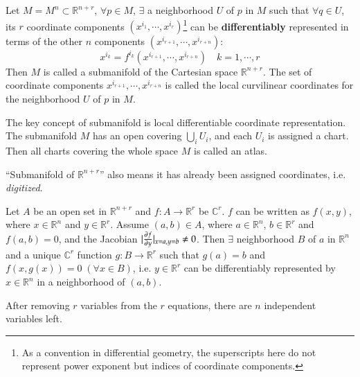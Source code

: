 \documentclass[11pt, a4paper]{book}
\begin{document}
\begin{Definition}
  Let $M = M^n \subset \mathbb{R}^{n+r}$, $\forall p \in M$, $\exists$ a neighborhood $U$
  of $p$ in $M$ such that $\forall q \in U$, its $r$ coordinate components
  $(x^{i_1}, \cdots, x^{i_r})$\footnote{As a convention in differential geometry, the
    superscripts here do not represent power exponent but indices of coordinate
    components.} can be \textbf{differentiably} represented in terms of the other $n$
  components $(x^{i_{r+1}}, \cdots, x^{i_{r+n}})$:
  $$
  x^{i_k} = f^{i_k}(x^{i_{r+1}}, \cdots, x^{i_{r+n}}) \quad k=1, \cdots, r
  $$
  Then $M$ is called a submanifold of the Cartesian space $\mathbb{R}^{n+r}$. The set of
  coordinate components $x^{i_{r+1}}, \cdots, x^{i_{r+n}}$ is called the local curvilinear
  coordinates for the neighborhood $U$ of $p$ in $M$.
\end{Definition}

\begin{Remark}
  The key concept of submanifold is local differentiable coordinate representation. The
  submanifold $M$ has an open covering $\bigcup_i U_i$, and each $U_i$ is assigned a
  chart. Then all charts covering the whole space $M$ is called an atlas.
\end{Remark}

\begin{Remark}
  ``Submanifold of $\mathbb{R}^{n+r}$'' also means it has already been assigned
  coordinates, i.e. \textit{digitized}.
\end{Remark}

\begin{Theorem}
  \label{theo:implicit-func}
  Let $A$ be an open set in $\mathbb{R}^{n+r}$ and $f: A \rightarrow \mathbb{R}^r$ be
  $\mathbb{C}^r$. $f$ can be written as $f(x,y)$, where $x \in \mathbb{R}^n$ and
  $y \in \mathbb{R}^{r}$. Assume $(a,b) \in A$, where $a \in \mathbb{R}^n$,
  $b \in \mathbb{R}^r$ and $f(a,b) = 0$, and the Jacobian
  $\lvert\frac{\partial f}{\partial y}\rvert_{x=a, y=b} \neq 0$. Then $\exists$ neighborhood $B$ of
  $a$ in $\mathbb{R}^n$ and a unique $\mathbb{C}^r$ function
  $g: B \rightarrow \mathbb{R}^r$ such that $g(a) = b$ and
  $f(x, g(x)) = 0 \; (\forall x \in B)$, i.e. $y \in \mathbb{R}^r$ can be differentiably
  represented by $x \in \mathbb{R}^n$ in a neighborhood of $(a,b)$.
\end{Theorem}

\begin{Remark}
  After removing $r$ variables from the $r$ equations, there are $n$ independent variables
  left.
\end{Remark}
\end{document}

